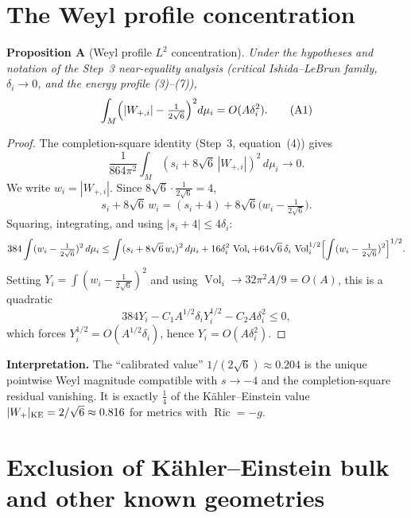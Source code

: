 %

\section{The Weyl profile concentration}

\noindent\textbf{Proposition A} (Weyl profile \(L^2\) concentration).
\emph{Under the hypotheses and notation of the Step~3 near-equality analysis
(critical Ishida--LeBrun family, \(\delta_i\to0\), and the energy profile (3)--(7)),}
\[
  \int_M\Bigl(|W_{+,i}|-\tfrac{1}{2\sqrt6}\Bigr)^2d\mu_i
  =O(A\delta_i^2).                                          \tag{A1}
\]

\begin{proof}
The completion-square identity (Step~3, equation~(4)) gives
\[
  \frac{1}{864\pi^2}\int_M(s_i+8\sqrt6\,|W_{+,i}|)^2\,d\mu_i\to0.
\]
We write \(w_i=|W_{+,i}|\).  Since \(8\sqrt6\cdot\tfrac{1}{2\sqrt6}=4\),
\[
  s_i+8\sqrt6\,w_i
  =(s_i+4)+8\sqrt6\bigl(w_i-\tfrac{1}{2\sqrt6}\bigr).
\]
Squaring, integrating, and using \(|s_i+4|\le4\delta_i\):
\[
  384\int(w_i-\tfrac{1}{2\sqrt6})^2\,d\mu_i
  \le\int(s_i+8\sqrt6\,w_i)^2\,d\mu_i
    +16\delta_i^2\,\operatorname{Vol}_i
    +64\sqrt6\,\delta_i\,\operatorname{Vol}_i^{1/2}
    \Bigl[\int(w_i-\tfrac{1}{2\sqrt6})^2\Bigr]^{1/2}.
\]
Setting \(Y_i=\int(w_i-\tfrac{1}{2\sqrt6})^2\) and using
\(\operatorname{Vol}_i\to32\pi^2A/9=O(A)\), this is a quadratic
\[
  384Y_i-C_1A^{1/2}\delta_i Y_i^{1/2}-C_2A\delta_i^2\le0,
\]
which forces \(Y_i^{1/2}=O(A^{1/2}\delta_i)\), hence \(Y_i=O(A\delta_i^2)\).
\end{proof}

\noindent\textbf{Interpretation.}
The ``calibrated value'' \(1/(2\sqrt6)\approx0.204\) is the unique pointwise
Weyl magnitude compatible with \(s\to-4\) and the completion-square residual
vanishing.  It is exactly \(\tfrac14\) of the K\"ahler--Einstein value
\(|W_+|_{\rm KE}=2/\sqrt6\approx0.816\) for metrics with \(\operatorname{Ric}=-g\).

\section{Exclusion of K\"ahler--Einstein bulk and other known geometries}

